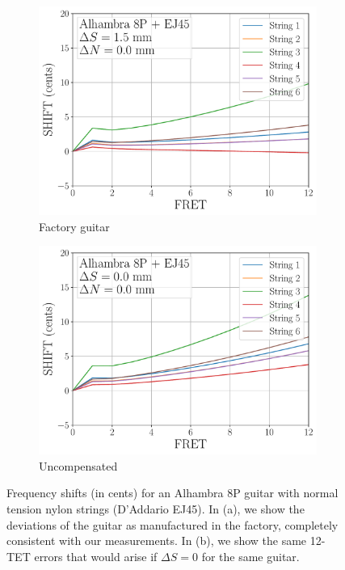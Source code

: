  \begin{figure}
  \centering
  \begin{subfigure}[b]{0.8\textwidth}
   \centering
   \includegraphics[width=5.0in]{figures/shift_alhambra8p_ej45_factory}
   \caption{Factory guitar}
   \label{fig:shift_alhambra8p_ej45_factory}
  \end{subfigure}
  \par\vspace{0.25in}
  \begin{subfigure}[b]{0.8\textwidth}
   \centering
   \includegraphics[width=5.0in]{figures/shift_alhambra8p_ej45_null}
   \caption{Uncompensated}
   \label{fig:shift_alhambra8p_ej45_null}
  \end{subfigure}
  \caption{\label{fig:alhambra8p_ej45} Frequency shifts (in cents) for an Alhambra 8P guitar with normal tension nylon strings (D'Addario EJ45). In (a), we show the deviations of the guitar as manufactured in the factory, completely consistent with our measurements. In (b), we show the same 12-TET errors that would arise if $\Delta S = 0$ for the same guitar.}
 \end{figure}

